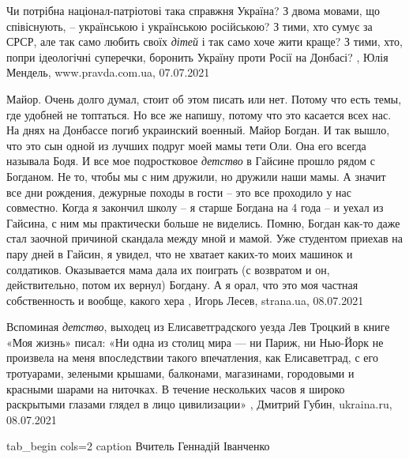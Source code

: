 Чи потрібна націонал-патріотові така справжня Україна? З двома мовами, що
співіснують, – українською і українською російською? З тими, хто сумує за СРСР,
але так само любить своїх \emph{дітей} і так само хоче жити краще?  З тими,
хто, попри ідеологічні суперечки, боронить Україну проти Росії на Донбасі?
, 
Юлія Мендель, www.pravda.com.ua, 07.07.2021

Майор.
Очень долго думал, стоит об этом писать или нет. Потому что есть темы, где
удобней не топтаться. Но все же напишу, потому что это касается всех нас.
На днях на Донбассе погиб украинский военный. Майор Богдан. И так вышло, что
это сын одной из лучших подруг моей мамы тети Оли. Она его всегда называла
Бодя. И все мое подростковое \emph{детство} в Гайсине прошло рядом с Богданом. Не то,
чтобы мы с ним дружили, но дружили наши мамы. А значит все дни рождения,
дежурные походы в гости – это все проходило у нас совместно.
Когда я закончил школу – я старше Богдана на 4 года – и уехал из Гайсина, с ним
мы практически больше не виделись. Помню, Богдан как-то даже стал заочной
причиной скандала между мной и мамой. Уже студентом приехав на пару дней в
Гайсин, я увидел, что не хватает каких-то моих машинок и солдатиков.
Оказывается мама дала их поиграть (с возвратом и он, действительно, потом их
вернул) Богдану. А я орал, что это моя частная собственность и вообще, какого
хера
, 
Игорь Лесев, strana.ua, 08.07.2021

Вспоминая \emph{детство}, выходец из Елисаветградского уезда Лев Троцкий в
книге «Моя жизнь» писал: «Ни одна из столиц мира — ни Париж, ни Нью-Йорк не
произвела на меня впоследствии такого впечатления, как Елисаветград, с его
тротуарами, зелеными крышами, балконами, магазинами, городовыми и красными
шарами на ниточках. В течение нескольких часов я широко раскрытыми глазами
глядел в лицо цивилизации»
, Дмитрий Губин, ukraina.ru, 08.07.2021


\ifcmt
  tab_begin cols=2
     caption Вчитель Геннадій Іванченко

